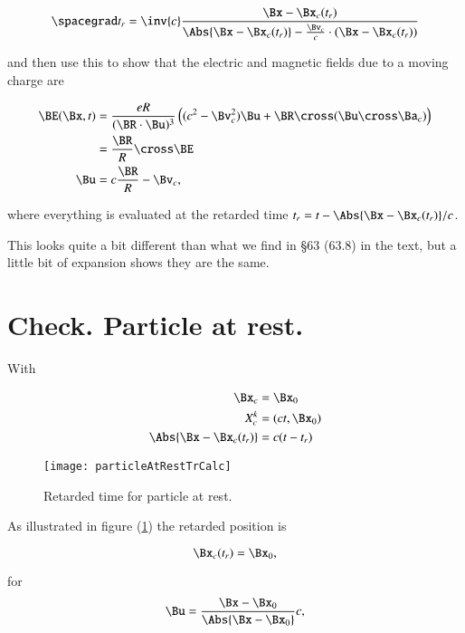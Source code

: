 \begin{equation}\label{eqn:relativisticElectrodynamicsL19:50}
\spacegrad t_r = \inv{c} \frac{\Bx - \Bx_c(t_r) }{
\Abs{\Bx - \Bx_c(t_r) } - \frac{\Bv_c }{c} \cdot (\Bx - \Bx_c(t_r))}
\end{equation}

and then use this to show that the electric and magnetic fields due to a moving charge are

\begin{align}\label{eqn:relativisticElectrodynamicsL19:70}
\BE(\Bx, t) 
&= \frac{e R}{ (\BR \cdot \Bu)^3 } \left( (c^2 - \Bv_c^2) \Bu + \BR \cross (\Bu \cross \Ba_c) \right) \\
&= \frac{\BR}{R} \cross \BE \\
\Bu &= c \frac{\BR}{R} - \Bv_c,
\end{align}

where everything is evaluated at the retarded time $t_r = t - \Abs{\Bx - \Bx_c(t_r)}/c$.

This looks quite a bit different than what we find in \S 63 (63.8) in the text, but a little bit of expansion shows they are the same.

\section{Check.  Particle at rest.}

With

\begin{align*}
\Bx_c &= \Bx_0 \\
X_c^k &= (ct, \Bx_0) \\
\Abs{\Bx - \Bx_c(t_r)} &= c(t - t_r)
\end{align*}

\begin{figure}[htp]
\centering
\texttt{[image: particleAtRestTrCalc]}
\caption{Retarded time for particle at rest.}
\label{fig:particleAtRestTrCalc}
\end{figure}

As illustrated in figure (\ref{fig:particleAtRestTrCalc}) the retarded position is

\begin{equation}\label{eqn:relativisticElectrodynamicsL19:100}
\Bx_c(t_r) = \Bx_0,
\end{equation}

for
\begin{equation}\label{eqn:relativisticElectrodynamicsL19:120}
\Bu = \frac{\Bx - \Bx_0}{\Abs{\Bx - \Bx_0}} c,
\end{equation}

